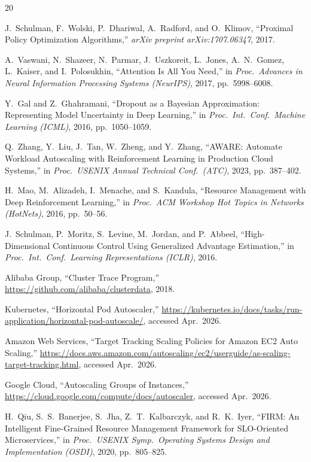 \documentclass[conference]{IEEEtran}
\begin{document}
\balance
\begin{thebibliography}{20}

J.~Schulman, F.~Wolski, P.~Dhariwal, A.~Radford, and O.~Klimov,
``Proximal Policy Optimization Algorithms,''
\textit{arXiv preprint arXiv:1707.06347}, 2017.

A.~Vaswani, N.~Shazeer, N.~Parmar, J.~Uszkoreit, L.~Jones, A.~N.~Gomez,
L.~Kaiser, and I.~Polosukhin,
``Attention Is All You Need,''
in \textit{Proc.\ Advances in Neural Information Processing Systems (NeurIPS)},
2017, pp.\ 5998--6008.

Y.~Gal and Z.~Ghahramani,
``Dropout as a Bayesian Approximation: Representing Model Uncertainty in
Deep Learning,''
in \textit{Proc.\ Int.\ Conf.\ Machine Learning (ICML)}, 2016, pp.\ 1050--1059.

Q.~Zhang, Y.~Liu, J.~Tan, W.~Zheng, and Y.~Zhang,
``AWARE: Automate Workload Autoscaling with Reinforcement Learning in
Production Cloud Systems,''
in \textit{Proc.\ USENIX Annual Technical Conf.\ (ATC)}, 2023, pp.\ 387--402.

H.~Mao, M.~Alizadeh, I.~Menache, and S.~Kandula,
``Resource Management with Deep Reinforcement Learning,''
in \textit{Proc.\ ACM Workshop Hot Topics in Networks (HotNets)}, 2016,
pp.\ 50--56.

J.~Schulman, P.~Moritz, S.~Levine, M.~Jordan, and P.~Abbeel,
``High-Dimensional Continuous Control Using Generalized Advantage Estimation,''
in \textit{Proc.\ Int.\ Conf.\ Learning Representations (ICLR)}, 2016.

Alibaba Group,
``Cluster Trace Program,''
\url{https://github.com/alibaba/clusterdata}, 2018.

Kubernetes,
``Horizontal Pod Autoscaler,''
\url{https://kubernetes.io/docs/tasks/run-application/horizontal-pod-autoscale/},
accessed Apr.\ 2026.

Amazon Web Services,
``Target Tracking Scaling Policies for Amazon EC2 Auto Scaling,''
\url{https://docs.aws.amazon.com/autoscaling/ec2/userguide/as-scaling-target-tracking.html},
accessed Apr.\ 2026.

Google Cloud,
``Autoscaling Groups of Instances,''
\url{https://cloud.google.com/compute/docs/autoscaler},
accessed Apr.\ 2026.

H.~Qiu, S.~S.~Banerjee, S.~Jha, Z.~T.~Kalbarczyk, and R.~K.~Iyer,
``FIRM: An Intelligent Fine-Grained Resource Management Framework for SLO-Oriented Microservices,''
in \textit{Proc.\ USENIX Symp.\ Operating Systems Design and Implementation (OSDI)},
2020, pp.\ 805--825.


\end{thebibliography}
\end{document}
